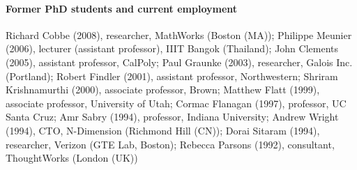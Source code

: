 \documentclass[11pt]{article}
\begin{document}
\paragraph{Former PhD students and current employment} 
Richard Cobbe (2008), researcher, MathWorks (Boston (MA)); 
Philippe Meunier (2006), lecturer (assistant professor), IIIT Bangok (Thailand); 
John Clements (2005), assistant professor, CalPoly; 
Paul Graunke (2003), researcher, Galois Inc. (Portland); 
Robert Findler (2001), assistant professor, Northwestern; 
Shriram Krishnamurthi (2000), associate professor, Brown; 
Matthew Flatt (1999), associate professor, University of Utah; 
Cormac Flanagan (1997), professor, UC Santa Cruz; 
Amr Sabry (1994), professor, Indiana University; 
Andrew Wright (1994), CTO, N-Dimension (Richmond Hill (CN));
Dorai Sitaram (1994), researcher, Verizon (GTE Lab, Boston); 
Rebecca Parsons (1992), consultant, ThoughtWorks (London (UK))

\thispagestyle{empty}
\end{document}
